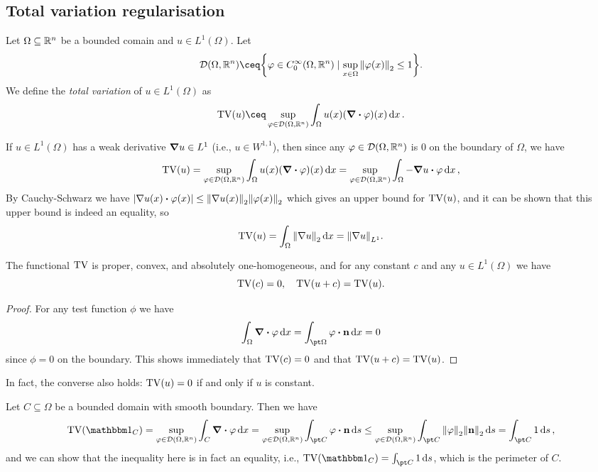 \subsection{Total variation regularisation}
\begin{definition}
	Let $\Omega \subseteq \mathbb R^n$ be a bounded comain and $u \in L^1(\Omega)$. Let
	\[
	\DD(\Omega, \RR^n) \ceq \qty{\phi \in C_0^\infty(\Omega, \RR^n) \mid \sup_{x \in \Omega} \norm{\phi(x)}_2 \leq 1}. 
	\]
	We define the \emph{total variation} of $u \in L^1(\Omega)$ as
	\[
	\TV(u) \ceq \sup_{\phi \in \DD(\Omega, \RR^n)} \int_\Omega u(x) (\div \phi)(x) \dd{x}. 
	\]
\end{definition}

\begin{example}
	If $u \in L^1(\Omega)$ has a weak derivative $\grad u \in L^1$ (i.e., $u \in W^{1, 1}$), then since any $\varphi \in \mathcal D(\Omega, \mathbb R^n)$ is 0 on the boundary of $\Omega$, we have
	\[
	\TV(u) = \sup_{\phi \in \DD(\Omega, \RR^n)} \int_\Omega u(x) (\div\phi)(x) \dd{x} =  \sup_{\phi \in \DD(\Omega, \RR^n)} \int_\Omega -\grad u \vdot \phi \dd{x}, 
	\]
	By Cauchy-Schwarz we have $\abs{\nabla u(x) \vdot \phi(x)} \leq \norm{\nabla u(x)}_2 \norm{\phi(x)}_2$ which gives an upper bound for $\operatorname{TV}(u)$, and it can be shown that this upper bound is indeed an equality, so
	\[
	\operatorname{TV}(u) = \int_\Omega \norm{\nabla u}_2 \dd{x} = \norm{\nabla u}_{L^1}.
	\]
\end{example}

\begin{proposition}
	The functional $\operatorname{TV}$ is proper, convex, and absolutely one-homogeneous, and for any constant $c$ and any $u \in L^1(\Omega)$ we have
	\[
	\operatorname{TV}(c) = 0, \quad \operatorname{TV}(u + c) = \operatorname{TV}(u). 
	\]
\end{proposition}

\begin{proof}
	For any test function $\phi$ we have 
	\[
	\int_\Omega \div\phi \dd{x} = \int_{\pt\Omega} \phi \vdot \vec n \dd{x} = 0
	\]
	since $\phi = 0$ on the boundary. This shows immediately that $\operatorname{TV}(c) = 0$ and that $\operatorname{TV}(u + c) = \operatorname{TV}(u)$. 
\end{proof}

\begin{remark}
	In fact, the converse also holds: $\operatorname{TV}(u) = 0$ if and only if $u$ is constant. 
\end{remark}

\begin{example}
	Let $C \subseteq \Omega$ be a bounded domain with smooth boundary. Then we have
	\[
	\TV(\ind_C) = \sup_{\phi \in \DD(\Omega, \RR^n)} \int_C\div\phi \dd{x} = \sup_{\phi \in \DD(\Omega, \RR^n)} \int_{\pt C} \phi \vdot \vec n \dd{s} \leq \sup_{\phi \in \DD(\Omega, \RR^n)} \int_{\pt C} \norm{\phi}_2 \norm{\vec n}_2  \dd{s} = \int_{\pt C} 1 \dd{s},
	\]
	and we can show that the inequality here is in fact an equality, i.e., $\TV(\ind_C) = \int_{\pt C} 1 \dd{s}$, which is the perimeter of $C$. 
\end{example}

